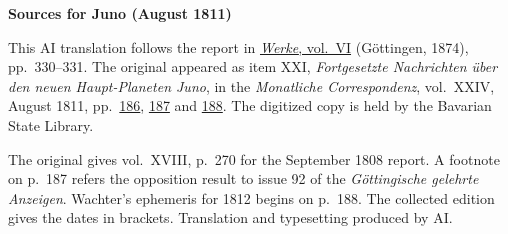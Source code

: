 \clearpage\thispagestyle{empty}
\begin{center}\textbf{Sources for Juno (August 1811)}\end{center}
\noindent This AI translation follows the report in \href{https://gdz.sub.uni-goettingen.de/id/PPN236007467}{\textit{Werke}, vol.~VI} (Göttingen, 1874), pp.~330--331. The original appeared as item XXI, \textit{Fortgesetzte Nachrichten über den neuen Haupt-Planeten Juno}, in the \textit{Monatliche Correspondenz}, vol.~XXIV, August 1811, pp.~\href{https://api.digitale-sammlungen.de/iiif/image/v2/bsb10538613_00196/full/1600,/0/default.jpg}{186}, \href{https://api.digitale-sammlungen.de/iiif/image/v2/bsb10538613_00197/full/1600,/0/default.jpg}{187} and \href{https://api.digitale-sammlungen.de/iiif/image/v2/bsb10538613_00198/full/1600,/0/default.jpg}{188}. The digitized copy is held by the Bavarian State Library.
\par\smallskip\noindent The original gives vol.~XVIII, p.~270 for the September 1808 report. A footnote on p.~187 refers the opposition result to issue 92 of the \textit{Göttingische gelehrte Anzeigen}. Wachter’s ephemeris for 1812 begins on p.~188. The collected edition gives the dates in brackets. Translation and typesetting produced by AI.
\clearpage
